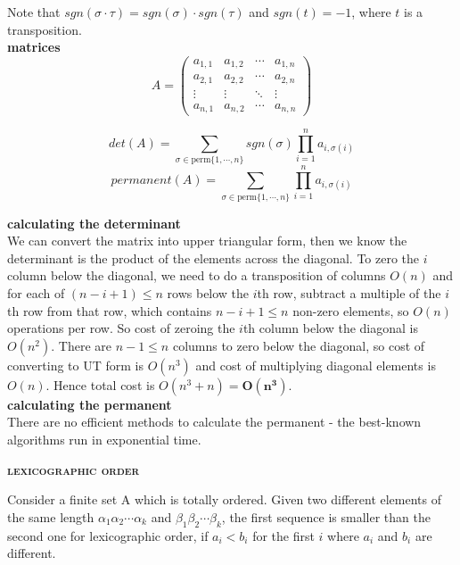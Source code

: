 \documentclass[a4paper]{article}
\begin{document}
\begin{multicols}{2}
\begin{framed}
	\noindent
	Note that $sgn(\sigma \cdot \tau) = sgn(\sigma) \cdot sgn(\tau)$ and $sgn(t) = -1$, where $t$ is a transposition.\\
	
	\noindent
	\textbf{matrices}\\
	$$A = 
 	\begin{pmatrix}
 	 a_{1,1} & a_{1,2} & \cdots & a_{1,n} \\
 	 a_{2,1} & a_{2,2} & \cdots & a_{2,n} \\
 	 \vdots  & \vdots  & \ddots & \vdots  \\
 	 a_{n,1} & a_{n,2} & \cdots & a_{n,n} 
 	\end{pmatrix}$$
 	
 	$$det(A) = \sum_{\sigma \in \text{perm}\{1, \cdots, n\}} sgn(\sigma)\prod^n_{i=1}a_{i,\sigma(i)}$$
 	$$permanent(A) = \sum_{\sigma \in \text{perm}\{1, \cdots, n\}} \prod^n_{i=1}a_{i,\sigma(i)}$$
	
	\noindent
	\textbf{calculating the determinant}\\
	We can convert the matrix into upper triangular form, then we know the determinant is the product of the elements across the diagonal. To zero the $i$ column below the diagonal, we need to do a transposition of columns $O(n)$ and for each of $(n - i + 1) \leq n$ rows below the $i$th row, subtract a multiple of the $i$th row from that row, which contains $n - i + 1 \leq n$ non-zero elements, so $O(n)$ operations per row. So cost of zeroing the $i$th column below the diagonal is $O(n^2)$. There are $n - 1 \leq n$ columns to zero below the diagonal, so cost of converting to UT form is $O(n^3)$ and cost of multiplying diagonal elements is $O(n)$. Hence total cost is $O(n^3 + n) = \bm{O(n^3)}$.\\
	
	\noindent
	\textbf{calculating the permanent}\\
	There are no efficient methods to calculate the permanent - the best-known algorithms run in exponential time.
\end{framed}

\begin{framed}
\begin{center}
	\textbf{\textsc{lexicographic order}}
\end{center}

\noindent
Consider a finite set A which is totally ordered. Given two different elements of the same length $\alpha_1\alpha_2\cdots\alpha_k$ and $\beta_1\beta_2\cdots\beta_k$, the first sequence is smaller than the second one for lexicographic order, if $a_i < b_i$ for the first $i$ where $a_i$ and $b_i$ are different.\\


\end{framed}
\end{multicols}
\end{document}
